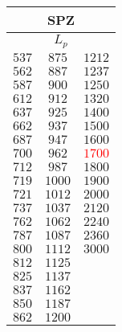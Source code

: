\begin{table}[]\tiny
\begin{tabular}{|c|c|c|}
\hline
\multicolumn{3}{|c|}{SPZ}   \\ \hline
\multicolumn{3}{|c|}{$L_p$} \\ \hline
$537$   & $875$    & $1212$ \\ \hline
$562$   & $887$    & $1237$ \\ \hline
$587$   & $900$    & $1250$ \\ \hline
$612$   & $912$    & $1320$ \\ \hline
$637$   & $925$    & $1400$ \\ \hline
$662$   & $937$    & $1500$ \\ \hline
$687$   & $947$    & $1600$ \\ \hline
$700$   & $962$    & \textcolor{red}{$1700$} \\ \hline
$712$   & $987$    & $1800$ \\ \hline
$719$   & $1000$   & $1900$ \\ \hline
$721$   & $1012$   & $2000$ \\ \hline
$737$   & $1037$   & $2120$ \\ \hline
$762$   & $1062$   & $2240$ \\ \hline
$787$   & $1087$   & $2360$ \\ \hline
$800$   & $1112$   & $3000$ \\ \hline
$812$   & $1125$   &        \\ \hline
$825$   & $1137$   &        \\ \hline
$837$   & $1162$   &        \\ \hline
$850$   & $1187$   &        \\ \hline
$862$   & $1200$   &        \\ \hline
\end{tabular}
\end{table}
